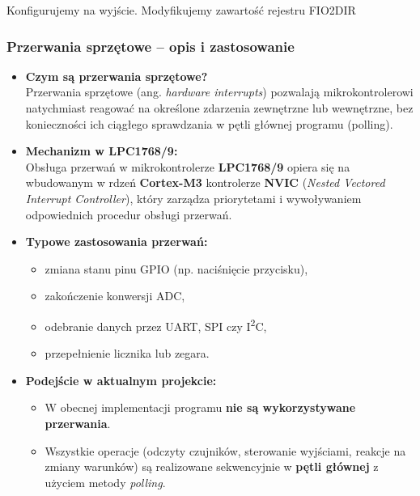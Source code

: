 Konfigurujemy na wyjście. Modyfikujemy zawartość rejestru FIO2DIR

\subsubsection{Przerwania sprzętowe – opis i zastosowanie}

\begin{itemize}
    \item \textbf{Czym są przerwania sprzętowe?} \\
    Przerwania sprzętowe (ang. \textit{hardware interrupts}) pozwalają mikrokontrolerowi natychmiast reagować na określone zdarzenia zewnętrzne lub wewnętrzne, bez konieczności ich ciągłego sprawdzania w pętli głównej programu (polling).
    
    \item \textbf{Mechanizm w LPC1768/9:} \\
    Obsługa przerwań w mikrokontrolerze \textbf{LPC1768/9} opiera się na wbudowanym w rdzeń \textbf{Cortex-M3} kontrolerze \textbf{NVIC} (\textit{Nested Vectored Interrupt Controller}), który zarządza priorytetami i wywoływaniem odpowiednich procedur obsługi przerwań.
    
    \item \textbf{Typowe zastosowania przerwań:}
    \begin{itemize}
        \item zmiana stanu pinu GPIO (np. naciśnięcie przycisku),
        \item zakończenie konwersji ADC,
        \item odebranie danych przez UART, SPI czy I\textsuperscript{2}C,
        \item przepełnienie licznika lub zegara.
    \end{itemize}

    \item \textbf{Podejście w aktualnym projekcie:}
    \begin{itemize}
        \item W obecnej implementacji programu \textbf{nie są wykorzystywane przerwania}.
        \item Wszystkie operacje (odczyty czujników, sterowanie wyjściami, reakcje na zmiany warunków) są realizowane sekwencyjnie w \textbf{pętli głównej} z użyciem metody \textit{polling}.
    \end{itemize}


\end{itemize}
